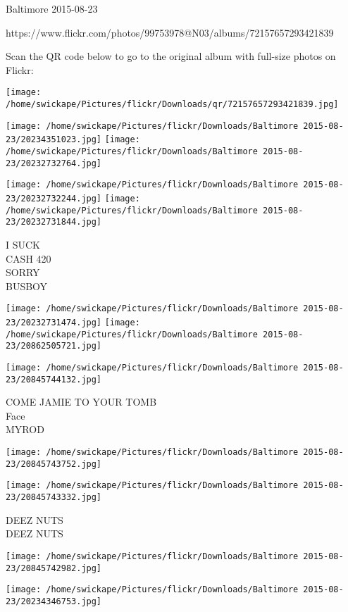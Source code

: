 \documentclass[10pt,letterpaper]{article}
\begin{document}
Baltimore 2015-08-23

https://www.flickr.com/photos/99753978@N03/albums/72157657293421839

Scan the QR code below to go to the original album with full-size photos on Flickr:

\texttt{[image: /home/swickape/Pictures/flickr/Downloads/qr/72157657293421839.jpg]}
\pagebreak

\texttt{[image: /home/swickape/Pictures/flickr/Downloads/Baltimore 2015-08-23/20234351023.jpg]}
\texttt{[image: /home/swickape/Pictures/flickr/Downloads/Baltimore 2015-08-23/20232732764.jpg]}

\texttt{[image: /home/swickape/Pictures/flickr/Downloads/Baltimore 2015-08-23/20232732244.jpg]}
\texttt{[image: /home/swickape/Pictures/flickr/Downloads/Baltimore 2015-08-23/20232731844.jpg]}

I SUCK\\
CASH 420\\
SORRY\\
BUSBOY\\
\pagebreak

\texttt{[image: /home/swickape/Pictures/flickr/Downloads/Baltimore 2015-08-23/20232731474.jpg]}
\texttt{[image: /home/swickape/Pictures/flickr/Downloads/Baltimore 2015-08-23/20862505721.jpg]}

\texttt{[image: /home/swickape/Pictures/flickr/Downloads/Baltimore 2015-08-23/20845744132.jpg]}

COME JAMIE TO YOUR TOMB\\
Face\\
MYROD\\
\pagebreak

\texttt{[image: /home/swickape/Pictures/flickr/Downloads/Baltimore 2015-08-23/20845743752.jpg]}

\vspace{0.25in}
\texttt{[image: /home/swickape/Pictures/flickr/Downloads/Baltimore 2015-08-23/20845743332.jpg]}

DEEZ NUTS\\
DEEZ NUTS\\
\pagebreak

\texttt{[image: /home/swickape/Pictures/flickr/Downloads/Baltimore 2015-08-23/20845742982.jpg]}

\vspace{0.25in}
\texttt{[image: /home/swickape/Pictures/flickr/Downloads/Baltimore 2015-08-23/20234346753.jpg]}
\end{document}
